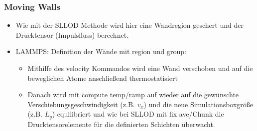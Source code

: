 \documentclass[a4paper, 10pt, 
               numbers=noenddot, toc=graduated,
               headsepline=true, footsepline=true,
               twoside=false, titlepage=true, 
               bibliography=totoc]{scrartcl}
\begin{document}
	\subsubsection{Moving Walls}
	    \begin{itemize}
		 	\item Wie mit der SLLOD Methode wird hier eine Wandregion geschert und der Drucktensor (Impulsfluss) berechnet.
			\item LAMMPS: Definition der Wände mit region und group:
			\begin{itemize}
				\item Mithilfe des velocity Kommandos wird eine Wand verschoben und auf die beweglichen Atome anschließend thermostatisiert
				\item Danach wird mit compute temp/ramp auf wieder auf die gewünschte Verschiebungsgeschwindigkeit (z.B. $v_x$) und die neue Simulationsboxgröße (z.B. $L_y$) equilibriert und wie bei SLLOD mit fix ave/Chunk die Drucktensorelemente für die definierten Schichten überwacht.
			\end{itemize}
		\end{itemize}
		
\end{document}
